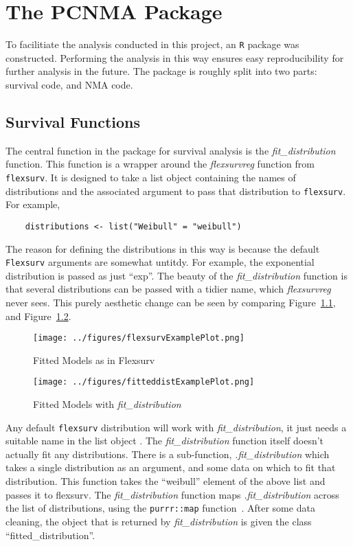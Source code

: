 \chapter{The PCNMA Package}\label{pack}

To facilitiate the analysis conducted in this project, an \verb|R| package was constructed. Performing the analysis in this way ensures easy reproducibility for further analysis in the future. The package is roughly split into two parts: survival code, and NMA code. 

\section{Survival Functions}
The central function in the package for survival analysis is the \textit{fit\_distribution} function. This function is a wrapper around the \textit{flexsurvreg} function from \verb|flexsurv|. It is designed to take a list object containing the names of distributions and the associated argument to pass that distribution to \verb|flexsurv|. For example, 

\begin{lstlisting}
    distributions <- list("Weibull" = "weibull")
\end{lstlisting}

The reason for defining the distributions in this way is because the default \verb|Flexsurv| arguments are somewhat untitdy. For example, the exponential distribution is passed as just ``exp''. The beauty of the \textit{fit\_distribution} function is that several distributions can be passed with a tidier name, which \textit{flexsurvreg} never sees. This purely aesthetic change can be seen by comparing Figure~\ref{fig:flexsurvlabelexample}, and Figure~\ref{fig:fitdistributionexampleplot}. \\

\begin{figure}[h]
    \texttt{[image: ../figures/flexsurvExamplePlot.png]}
    \caption{Fitted Models as in Flexsurv}
    \label{fig:flexsurvlabelexample}
\end{figure}

\begin{figure}[h]
    \texttt{[image: ../figures/fitteddistExamplePlot.png]}
    \caption{Fitted Models with \textit{fit\_distribution}}
    \label{fig:fitdistributionexampleplot}
\end{figure}

Any default \verb|flexsurv| distribution will work with \textit{fit\_distribution}, it just needs a suitable name in the list object . The \textit{fit\_distribution} function itself doesn't actually fit any distributions. There is a sub-function, \textit{.fit\_distribution} which takes a single distribution as an argument, and some data on which to fit that distribution. This function takes the ``weibull'' element of the above list and passes it to flexsurv. The \textit{fit\_distribution} function maps \textit{.fit\_distribution} across the list of distributions, using the \verb|purrr::map| function~\cite{purrr}. After some data cleaning, the object that is returned by \textit{fit\_distribution} is given the class ``fitted\_distribution''.  \\

